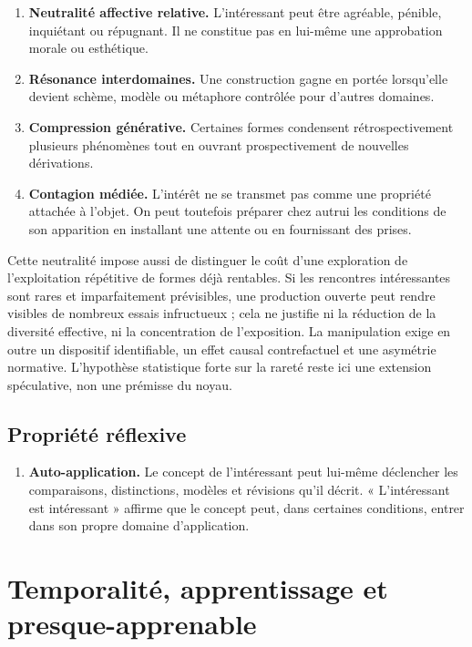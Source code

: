 \documentclass[11pt,a4paper]{article}
\begin{document}
\begin{enumerate}[resume]
  \item \textbf{Neutralité affective relative.} L'intéressant peut être
        agréable, pénible, inquiétant ou répugnant. Il ne constitue pas en
        lui-même une approbation morale ou esthétique.
  \item \textbf{Résonance interdomaines.} Une construction gagne en portée
        lorsqu'elle devient schème, modèle ou métaphore contrôlée pour d'autres
        domaines.
  \item \textbf{Compression générative.} Certaines formes condensent
        rétrospectivement plusieurs phénomènes tout en ouvrant prospectivement
        de nouvelles dérivations.
  \item \textbf{Contagion médiée.} L'intérêt ne se transmet pas comme une
        propriété attachée à l'objet. On peut toutefois préparer chez autrui les
        conditions de son apparition en installant une attente ou en fournissant
        des prises.
\end{enumerate}

Cette neutralité impose aussi de distinguer le coût d'une exploration de
l'exploitation répétitive de formes déjà rentables. Si les rencontres
intéressantes sont rares et imparfaitement prévisibles, une production ouverte
peut rendre visibles de nombreux essais infructueux ; cela ne justifie ni la
réduction de la diversité effective, ni la concentration de l'exposition. La
manipulation exige en outre un dispositif identifiable, un effet causal
contrefactuel et une asymétrie normative. L'hypothèse statistique forte sur la
rareté reste ici une extension spéculative, non une prémisse du noyau.

\subsection{Propriété réflexive}

\begin{enumerate}[resume]
  \item \textbf{Auto-application.} Le concept de l'intéressant peut lui-même
        déclencher les comparaisons, distinctions, modèles et révisions qu'il
        décrit. « L'intéressant est intéressant » affirme que le concept peut,
        dans certaines conditions, entrer dans son propre domaine
        d'application.
\end{enumerate}

\section{Temporalité, apprentissage et presque-apprenable}
\end{document}
